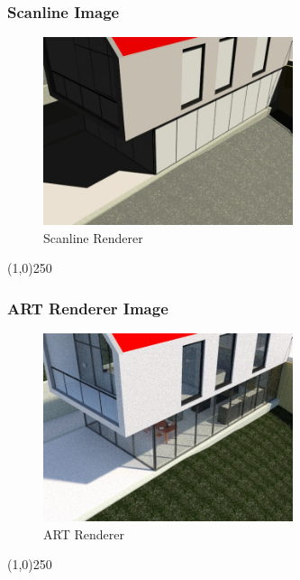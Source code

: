\begin{frame}
\frametitle{Scanline Image}
\begin{figure}
	\centering
		\includegraphics[height=5.5cm]{img/RenderEngine/Revit3DSScanLine.jpg}
	\caption{Scanline Renderer}
	\label{fig:Scanline}
\end{figure}
\end{frame}
\begin{center}\line(1,0){250}\end{center}


\begin{frame}
\frametitle{ART Renderer Image}
\begin{figure}
	\centering
	\includegraphics[height=5.5cm]{img/RenderEngine/Revit3DSARTRenderer.jpg}
	\caption{ART Renderer}
	\label{fig:ARTRenderer}
\end{figure}
\end{frame}
\begin{center}\line(1,0){250}\end{center}






